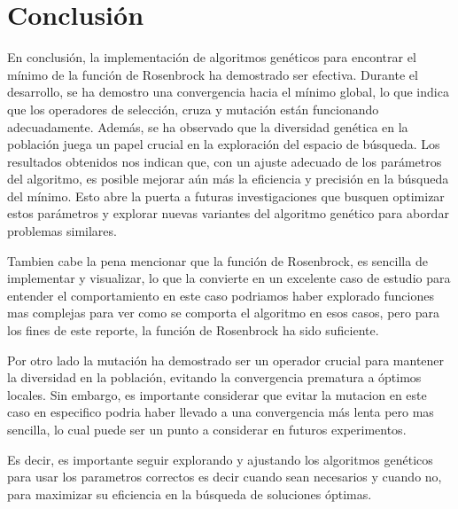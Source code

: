 \section{Conclusión}

En conclusión, la implementación de algoritmos genéticos para encontrar el mínimo de la 
función de Rosenbrock ha demostrado ser efectiva. Durante el desarrollo, se ha demostro
una convergencia hacia el mínimo global, lo que indica que los operadores de selección, cruza
y mutación están funcionando adecuadamente. Además, se ha observado que la diversidad
genética en la población juega un papel crucial en la exploración del espacio de búsqueda.
Los resultados obtenidos nos indican que, con un ajuste adecuado de los parámetros del algoritmo,
es posible mejorar aún más la eficiencia y precisión en la búsqueda del mínimo. Esto abre la
puerta a futuras investigaciones que busquen optimizar estos parámetros y explorar nuevas
variantes del algoritmo genético para abordar problemas similares.

Tambien cabe la pena mencionar que la función de Rosenbrock, es sencilla de implementar y
visualizar, lo que la convierte en un excelente caso de estudio para entender el comportamiento
en este caso podriamos haber explorado funciones mas complejas para ver como se comporta el algoritmo
en esos casos, pero para los fines de este reporte, la función de Rosenbrock ha sido suficiente.

Por otro lado la mutación ha demostrado ser un operador crucial para mantener la diversidad en la población,
evitando la convergencia prematura a óptimos locales. Sin embargo, es importante considerar que 
evitar la mutacion en este caso en especifico podria haber llevado a una convergencia más lenta
pero mas sencilla, lo cual puede ser un punto a considerar en futuros experimentos.

Es decir, es importante seguir explorando y ajustando los algoritmos genéticos para usar los parametros
correctos es decir cuando sean necesarios y cuando no, para maximizar su eficiencia en la búsqueda de soluciones óptimas.